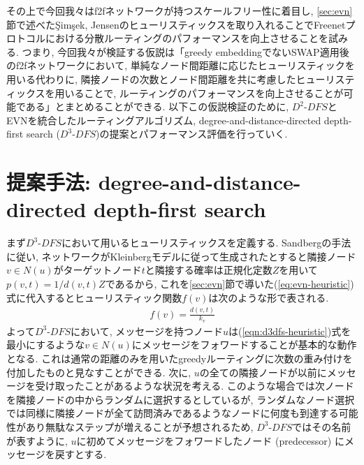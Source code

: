 \documentclass[dvipdfmx]{ampbt}
\begin{document}
その上で今回我々は\acrshort{f2f}ネットワークが持つスケールフリー性に着目し, \ref{sec:evn}節で述べた{\c{S}}im{\c{s}}ek, Jensenのヒューリスティックスを取り入れることでFreenetプロトコルにおける分散ルーティングのパフォーマンスを向上させることを試みる. つまり, 今回我々が検証する仮説は「greedy embeddingでないSWAP適用後の\acrshort{f2f}ネットワークにおいて, 単純なノード間距離に応じたヒューリスティックを用いる代わりに, 隣接ノードの次数とノード間距離を共に考慮したヒューリスティックスを用いることで, ルーティングのパフォーマンスを向上させることが可能である」とまとめることができる. 以下この仮説検証のために, $D^2$-$DFS$とEVNを統合したルーティングアルゴリズム, degree-and-distance-directed depth-first search ($D^3$-$DFS$)の提案とパフォーマンス評価を行っていく. 
\section{提案手法: degree-and-distance-directed depth-first search}
まず$D^3$-$DFS$において用いるヒューリスティックスを定義する. Sandbergの手法に従い, ネットワークがKleinbergモデルに従って生成されたとすると隣接ノード$v \in N(u)$がターゲットノード$t$と隣接する確率は正規化定数$Z$を用いて$p(v,t) = 1/d(v,t)Z$であるから, これを\ref{sec:evn}節で導いた(\ref{eq:evn-heuristic})式に代入するとヒューリスティック関数$f(v)$は次のような形で表される.
\begin{eqnarray}
f(v) = \frac{d(v,t)}{k_v} \label{eqn:d3dfs-heuristic}
\end{eqnarray}
よって$D^3$-$DFS$において, メッセージを持つノード$u$は(\ref{eqn:d3dfs-heuristic})式を最小にするような$v \in N(u)$にメッセージをフォワードすることが基本的な動作となる. これは通常の距離のみを用いたgreedyルーティングに次数の重み付けを付加したものと見なすことができる. 
次に, $u$の全ての隣接ノードが以前にメッセージを受け取ったことがあるような状況を考える. このような場合\cite{csimcsek2008navigating}では次ノードを隣接ノードの中からランダムに選択するとしているが, ランダムなノード選択では同様に隣接ノードが全て訪問済みであるようなノードに何度も到達する可能性があり無駄なステップが増えることが予想されるため, $D^3$-$DFS$ではその名前が表すように, $u$に初めてメッセージをフォワードしたノード (predecessor) にメッセージを戻すとする.
\end{document}
